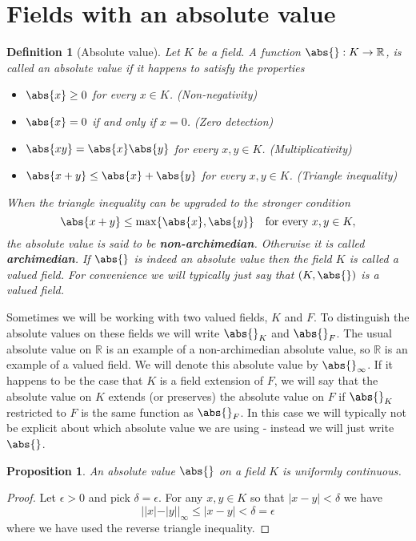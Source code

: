 \documentclass{article}
\newtheorem{definition}{Definition}[section]
\newtheorem{proposition}{Proposition}[section]
\newcommand{\mbb}[1]{\mathbb{#1}}
\begin{document}
\section{Fields with an absolute value}

\begin{definition}[Absolute value]
    Let $K$ be a field. A function $\abs{} : K \to \mbb R$, is called an absolute value if it happens to satisfy the properties
    \begin{itemize}
        \item $\abs{x} \geq 0$ for every $x \in K$. (Non-negativity)
        \item $\abs{x} = 0$ if and only if $x = 0$. (Zero detection)
        \item $\abs{xy} = \abs{x} \abs{y}$ for every $x,y \in K$. (Multiplicativity)
        \item $\abs{x + y} \leq \abs{x} + \abs{y}$ for every $x,y \in K$. (Triangle inequality)
    \end{itemize}
    When the triangle inequality can be upgraded to the stronger condition $$\abs{x + y} \leq \max \{\abs{x}, \abs{y}\} \quad \text{for every } x,y \in K,$$
    the absolute value is said to be \textbf{non-archimedian}. Otherwise it is called \textbf{archimedian}. If $\abs{}$ is indeed an absolute value then the field $K$ is called a valued field. For convenience we will typically just say that $(K, \abs{})$ is a valued field.  
\end{definition}
Sometimes we will be working with two valued fields, $K$ and $F$. To distinguish the absolute values on these fields we will write $\abs{}_K$ and $\abs{}_F$. The usual absolute value on $\mbb R$ is an example of a non-archimedian absolute value, so $\mbb R$ is an example of a valued field. We will denote this absolute value by $\abs{}_\infty$. If it happens to be the case that $K$ is a field extension of $F$, we will say that the absolute value on $K$ extends (or preserves) the absolute value on $F$ if $\abs{}_K$ restricted to $F$ is the same function as $\abs{}_F$. In this case we will typically not be explicit about which absolute value we are using - instead we will just write $\abs{}$.

\begin{proposition}
    An absolute value $\abs{}$ on a field $K$ is uniformly continuous.  
\end{proposition}
\begin{proof}
    Let $\epsilon > 0$ and pick $\delta = \epsilon$. For any $x,y \in K$ so that $|x - y| < \delta$ we have 
    $$||x| - |y||_\infty \leq |x - y| < \delta = \epsilon$$
    where we have used the reverse triangle inequality. 
\end{proof}
\end{document}
